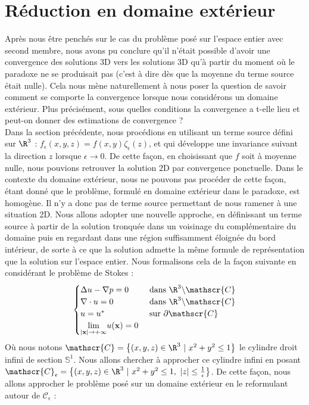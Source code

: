 \section{Réduction en domaine extérieur}

Après nous être penchés sur le cas du problème posé sur l'espace entier avec second membre, nous avons pu conclure qu'il n'était possible d'avoir une convergence des solutions 3D vers les solutions 3D qu'à partir du moment où le paradoxe ne se produisait pas (c'est à dire dès que la moyenne du terme source était nulle).
Cela nous mène naturellement à nous poser la question de savoir comment se comporte la convergence lorsque nous considérons un domaine extérieur. Plus précisément, sous quelles conditions la convergence a t-elle lieu et peut-on donner des estimations de convergence ? \\
Dans la section précédente, nous procédions en utilisant un terme source défini sur $\R^3$ : $f_{\epsilon}(x,y,z) = f(x,y)\zeta_{\epsilon}(z) $, et qui développe une invariance suivant la direction $z$ lorsque $\epsilon \to 0$. De cette façon, en choisissant que $f$ soit à moyenne nulle, nous pouvions retrouver 
la solution 2D par convergence ponctuelle. Dans le contexte du domaine extérieur, nous ne pouvons pas procéder de cette façon, étant donné que le problème, formulé en domaine extérieur dans le paradoxe, est homogène. Il n'y a donc pas de terme source permettant de nous ramener à une situation 2D. Nous allons adopter une nouvelle approche, en définissant un terme source à partir de la solution 
tronquée dans un voisinage du complémentaire du domaine puis en regardant dans une région suffisamment éloignée du bord intérieur, de sorte à ce que la solution admette la même formule de représentation que la solution sur l'espace entier.
Nous formalisons cela de la façon suivante en considérant le problème de Stokes : \\
$$\begin{cases}
    \Delta u - \nabla p = 0 \quad &\text{ dans } \R^3 \backslash \mathscr{C} \\
    \nabla \cdot u = 0 &\text{ dans } \R^3 \backslash \mathscr{C} \\
    u = u^* &\text{ sur } \partial \mathscr{C} \\
    \underset{|\mathbf{x}|\to +\infty}{\lim} u(\mathbf{x}) = 0
\end{cases}$$
Où nous notons $\mathscr{C} = \big\{ (x,y,z) \in \R^3 \ | \ x^2 + y^2 \leq 1 \big\} $ le cylindre droit infini de section $\mathbb{S}^1$. Nous allons chercher à approcher ce cylindre infini en posant $\mathscr{C}_{\epsilon} = \big\{ (x,y,z) \in \R^3 \ | \ x^2 + y^2 \leq 1, \ |z| \leq \frac{1}{\epsilon} \big\} $. De cette façon, nous allons approcher le problème posé sur un domaine extérieur en le reformulant autour de $\mathscr{C}_{\epsilon}$ :

